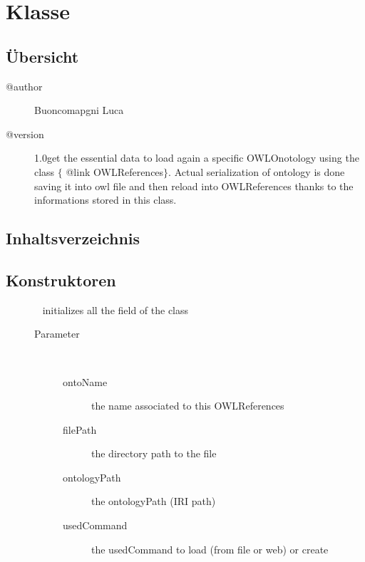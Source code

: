 
\section[OWLReferencesSerializable]{Klasse }\label{ontologyFramework.OFContextManagement.OWLReferencesSerializable-class}
\subsection{Übersicht}

\begin{description}
\item[@author] 
Buoncomapgni Luca
\item[@version] 
1.0\bl  get the essential data to load again a specific OWLOnotology using the class $\{$ @link OWLReferences$\}$.
 Actual serialization of ontology is done saving it into owl file and then reload into OWLReferences
 thanks to the informations stored in this class.
\end{description}
\subsection{Inhaltsverzeichnis}
\subsection{Konstruktoren}
\begin{description}
\item[{\label{ontologyFramework.OFContextManagement.OWLReferencesSerializable(java.lang.String,java.lang.String,java.lang.String,int)}}]
~ initializes all the field of the class
\begin{description}
\item[Parameter] ~
\begin{description}
\item[ontoName]
the name associated to this OWLReferences
\item[filePath]
the directory path to the file
\item[ontologyPath]
the ontologyPath (IRI path)
\item[usedCommand]
the usedCommand to load (from file or web) or create
\end{description}
\end{description}
\end{description}
